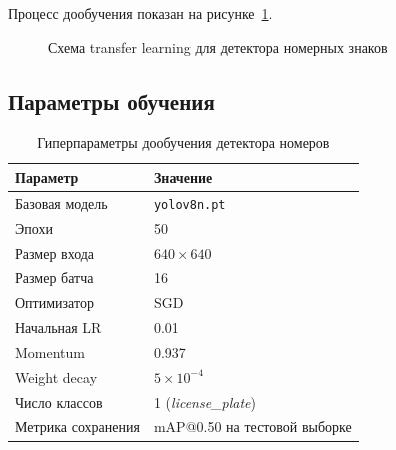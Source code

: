 \documentclass[14pt,a4paper]{report}
\numberwithin{equation}{chapter}
\numberwithin{figure}{chapter}
\numberwithin{table}{chapter}
\begin{document}
Процесс дообучения показан на рисунке~\ref{fig:transfer}.

\begin{figure}[H]
\centering
{}
\caption{Схема transfer learning для детектора номерных знаков}
\label{fig:transfer}
\end{figure}

\subsection{Параметры обучения}

\begin{table}[H]
\centering
\caption{Гиперпараметры дообучения детектора номеров}
\label{tab:plate_hp}
\begin{tabularx}{\textwidth}{lX}
\toprule
\textbf{Параметр} & \textbf{Значение} \\
\midrule
Базовая модель       & \texttt{yolov8n.pt} \\
Эпохи                & 50 \\
Размер входа         & $640 \times 640$ \\
Размер батча         & 16 \\
Оптимизатор          & SGD \\
Начальная LR         & 0.01 \\
Momentum             & 0.937 \\
Weight decay         & $5 \times 10^{-4}$ \\
Число классов        & 1 (\textit{license\_plate}) \\
Метрика сохранения   & mAP@0.50 на тестовой выборке \\
\bottomrule
\end{tabularx}
\end{table}
\end{document}
